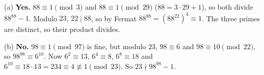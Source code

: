 (a) \textbf{Yes.} $88\equiv1\pmod3$ and $88\equiv1\pmod{29}$ ($88=3\cdot29+1$), so both divide $88^{88}-1$. Modulo $23$, $22\mid88$, so by Fermat $88^{88}=(88^{22})^4\equiv1$. The three primes are distinct, so their product divides.

(b) \textbf{No.} $98\equiv1\pmod{97}$ is fine, but modulo $23$, $98\equiv6$ and $98\equiv10\pmod{22}$, so $98^{98}\equiv6^{10}$. Now $6^2\equiv13$, $6^4\equiv8$, $6^8\equiv18$ and $6^{10}\equiv18\cdot13=234\equiv4\not\equiv1\pmod{23}$. So $23\nmid98^{98}-1$.
